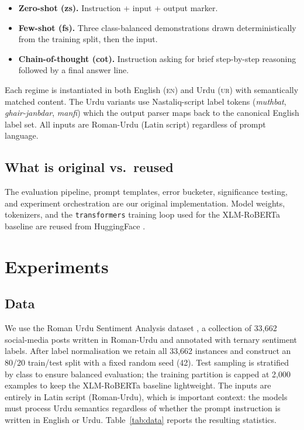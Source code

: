 \documentclass[conference]{IEEEtran}
\begin{document}
\begin{itemize}
  \item \textbf{Zero-shot (zs).} Instruction + input + output marker.
  \item \textbf{Few-shot (fs).} Three class-balanced demonstrations drawn
  deterministically from the training split, then the input.
  \item \textbf{Chain-of-thought (cot).} Instruction asking for brief
  step-by-step reasoning followed by a final answer line.
\end{itemize}

Each regime is instantiated in both English (\textsc{en}) and Urdu
(\textsc{ur}) with semantically matched content. The Urdu variants use
Nastaliq-script label tokens (\textit{muthbat}, \textit{ghair-janbdar},
\textit{manfi}) which the output parser maps back to the canonical English
label set. All inputs are Roman-Urdu (Latin script) regardless of prompt
language.

\subsection{What is original vs.\ reused}
The evaluation pipeline, prompt templates, error bucketer, significance
testing, and experiment orchestration are our original implementation.
Model weights, tokenizers, and the \texttt{transformers} training loop
used for the XLM-RoBERTa baseline are reused from HuggingFace
\cite{wolf2020transformers}.

\section{Experiments}

\subsection{Data}
We use the Roman Urdu Sentiment Analysis dataset \cite{romanurdu2023},
a collection of 33,662 social-media posts written in Roman-Urdu and
annotated with ternary sentiment labels. After label normalisation we
retain all 33,662 instances and construct an 80/20 train/test split with
a fixed random seed (42). Test sampling is stratified by class to ensure
balanced evaluation; the training partition is capped at 2,000 examples
to keep the XLM-RoBERTa baseline lightweight. The inputs are entirely in
Latin script (Roman-Urdu), which is important context: the models must
process Urdu semantics regardless of whether the prompt instruction is
written in English or Urdu. Table~\ref{tab:data} reports the resulting
statistics.
\end{document}
